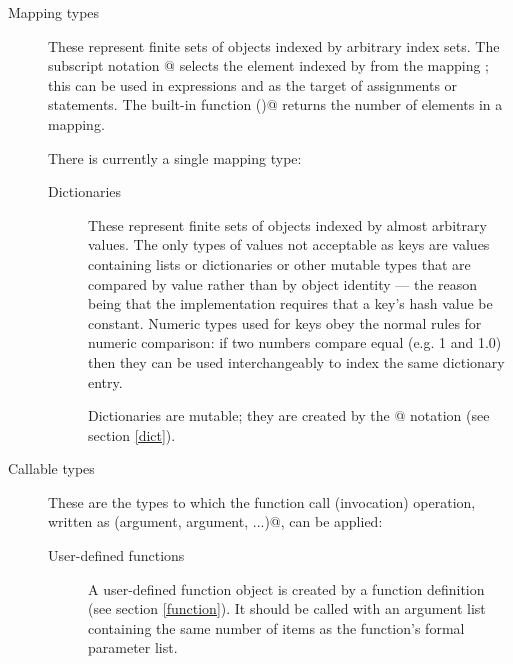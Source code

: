 \begin{description}
\begin{description}
\begin{description}
\end{description} %

\end{description} %

\item[Mapping types]
These represent finite sets of objects indexed by arbitrary index sets.
The subscript notation \verb@a[k]@ selects the element indexed
by \verb@k@ from the mapping \verb@a@; this can be used in
expressions and as the target of assignments or \verb@del@ statements.
The built-in function \verb@len()@ returns the number of elements
in a mapping.

There is currently a single mapping type:

\begin{description}

\item[Dictionaries]
These represent finite sets of objects indexed by almost arbitrary
values.  The only types of values not acceptable as keys are values
containing lists or dictionaries or other mutable types that are
compared by value rather than by object identity --- the reason being
that the implementation requires that a key's hash value be constant.
Numeric types used for keys obey the normal rules for numeric
comparison: if two numbers compare equal (e.g. 1 and 1.0) then they
can be used interchangeably to index the same dictionary entry.

Dictionaries are mutable; they are created by the @
notation (see section \ref{dict}).

\end{description} %

\item[Callable types]
These are the types to which the function call (invocation) operation,
written as \verb@function(argument, argument, ...)@, can be applied:

\begin{description}

\item[User-defined functions]
A user-defined function object is created by a function definition
(see section \ref{function}).  It should be called with an argument
list containing the same number of items as the function's formal
parameter list.


\end{description}
\end{description}
